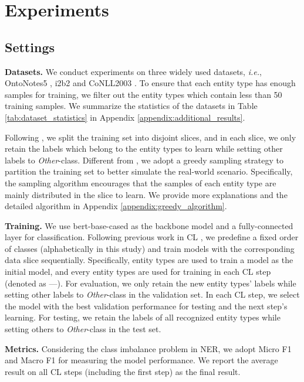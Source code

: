 \documentclass[11pt]{article}
\begin{document}
\section{Experiments}
\subsection{Settings}
\noindent\textbf{Datasets.}\quad 
We conduct experiments on three widely used datasets, \textit{i.e.}, OntoNotes5 \citep{hovy2006ontonotes}, i2b2 \citep{murphy2010serving} and CoNLL2003 \citep{sang2003introduction}.
To ensure that each entity type has enough samples for training, we filter out the entity types which contain less than 50 training samples.
We summarize the statistics of the datasets in Table \ref{tab:dataset_statistics} in Appendix \ref{appendix:additional_results}.

Following \citet{monaikul2021continual}, we split the training set into disjoint slices, and in each slice, we only retain the labels which belong to the entity types to learn while setting other labels to \textit{Other}-class.
Different from \citet{monaikul2021continual}, we adopt a greedy sampling strategy to partition the training set to better simulate the real-world scenario.
Specifically, the sampling algorithm encourages that the samples of each entity type are mainly distributed in the slice to learn.
We provide more explanations and the detailed algorithm in Appendix \ref{appendix:greedy_algorithm}. 

\noindent\textbf{Training.}\quad
We use bert-base-cased \citep{devlin-etal-2019-bert} as the backbone model and a fully-connected layer for classification.
Following previous work in CL \citep{hu2021distilling}, we predefine a fixed order of classes (alphabetically in this study) and train models with the corresponding data slice sequentially.
Specifically,  entity types are used to train a model as the initial model, and every  entity types are used for training in each CL step (denoted as ---).
For evaluation, we only retain the new entity types' labels while setting other labels to \textit{Other}-class in the validation set. 
In each CL step, we select the model with the best validation performance for testing and the next step's learning. 
For testing, we retain the labels of all recognized entity types while setting others to \textit{Other}-class in the test set.

\noindent\textbf{Metrics.}\quad
Considering the class imbalance problem in NER, we adopt Micro F1 and Macro F1 for measuring the model performance.
We report the average result on all CL steps (including the first step) as the final result.
\end{document}
